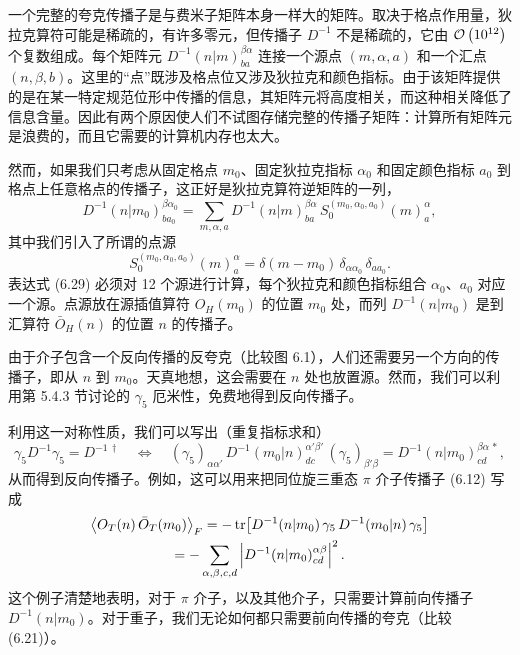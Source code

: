 一个完整的夸克传播子是与费米子矩阵本身一样大的矩阵。取决于格点作用量，狄拉克算符可能是稀疏的，有许多零元，但传播子 $D^{-1}$ 不是稀疏的，它由 $\mathcal{O}\left(10^{12}\right)$ 个复数组成。每个矩阵元 $D^{-1}(n|m)^{\beta\alpha}_{ba}$ 连接一个源点 $(m, \alpha, a)$ 和一个汇点 $(n, \beta, b)$。这里的“点”既涉及格点位又涉及狄拉克和颜色指标。由于该矩阵提供的是在某一特定规范位形中传播的信息，其矩阵元将高度相关，而这种相关降低了信息含量。因此有两个原因使人们不试图存储完整的传播子矩阵：计算所有矩阵元是浪费的，而且它需要的计算机内存也太大。

然而，如果我们只考虑从固定格点 $m_0$、固定狄拉克指标 $\alpha_0$ 和固定颜色指标 $a_0$ 到格点上任意格点的传播子，这正好是狄拉克算符逆矩阵的一列，
\begin{equation}
  D^{-1}(n|m_0)^{\beta\alpha_0}_{b a_0}
  = \sum_{m,\alpha,a} D^{-1}(n|m)^{\beta\alpha}_{ba}\,
    S_0^{(m_0,\alpha_0,a_0)}(m)^{\alpha}_{a} ,
\end{equation}
其中我们引入了所谓的点源
\begin{equation}
  S_0^{(m_0,\alpha_0,a_0)}(m)^{\alpha}_{a}
  = \delta(m - m_0)\, \delta_{\alpha\alpha_0}\, \delta_{aa_0} .
\end{equation}
表达式 (6.29) 必须对 12 个源进行计算，每个狄拉克和颜色指标组合 $\alpha_0$、$a_0$ 对应一个源。点源放在源插值算符 $O_H(m_0)$ 的位置 $m_0$ 处，而列 $D^{-1}(n|m_0)$ 是到汇算符 $\bar{O}_H(n)$ 的位置 $n$ 的传播子。

由于介子包含一个反向传播的反夸克（比较图 6.1），人们还需要另一个方向的传播子，即从 $n$ 到 $m_0$。天真地想，这会需要在 $n$ 处也放置源。然而，我们可以利用第 5.4.3 节讨论的 $\gamma_5$ 厄米性，免费地得到反向传播子。

利用这一对称性质，我们可以写出（重复指标求和）
\begin{equation}
  \gamma_5 D^{-1} \gamma_5 = D^{-1\,\dagger}
  \quad\Longleftrightarrow\quad
  (\gamma_5)_{\alpha\alpha'}\, D^{-1}(m_0|n)^{\alpha'\beta'}_{dc}\,
  (\gamma_5)_{\beta'\beta} = D^{-1}(n|m_0)^{\beta\alpha\,*}_{cd} ,
\end{equation}
从而得到反向传播子。例如，这可以用来把同位旋三重态 $\pi$ 介子传播子 (6.12) 写成
\begin{multline}
  \big\langle O_T(n)\, \bar{O}_T(m_0) \big\rangle_F
  = -\operatorname{tr}\!\left[ D^{-1}(n|m_0)\, \gamma_5\, D^{-1}(m_0|n)\, \gamma_5 \right] \\
  = -\sum_{\alpha,\beta,c,d} \left| D^{-1}(n|m_0)^{\alpha\beta}_{cd}
    \right|^2 .
\end{multline}
这个例子清楚地表明，对于 $\pi$ 介子，以及其他介子，只需要计算前向传播子 $D^{-1}(n|m_0)$。对于重子，我们无论如何都只需要前向传播的夸克（比较 (6.21)）。

